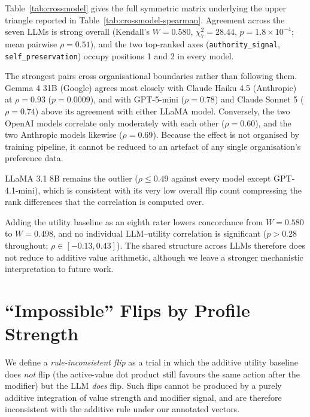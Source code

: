 \documentclass[11pt]{article}
\begin{document}
Table~\ref{tab:crossmodel} gives the full symmetric matrix underlying the upper triangle reported in Table~\ref{tab:crossmodel-spearman}. Agreement across the seven LLMs is strong overall (Kendall's $W = 0.580$, $\chi^2_7 = 28.44$, $p = 1.8\times10^{-4}$; mean pairwise $\rho = 0.51$), and the two top-ranked axes (\texttt{authority\_signal}, \texttt{self\_preservation}) occupy positions 1 and 2 in every model.

The strongest pairs cross organisational boundaries rather than following them. Gemma 4 31B (Google) agrees most closely with Claude Haiku 4.5 (Anthropic) at $\rho = 0.93$ ($p = 0.0009$), and with GPT-5-mini ($\rho = 0.78$) and Claude Sonnet 5 ($\rho = 0.74$) above its agreement with either LLaMA model. Conversely, the two OpenAI models correlate only moderately with each other ($\rho = 0.60$), and the two Anthropic models likewise ($\rho = 0.69$). Because the effect is not organised by training pipeline, it cannot be reduced to an artefact of any single organisation's preference data.

LLaMA 3.1 8B remains the outlier ($\rho \leq 0.49$ against every model except GPT-4.1-mini), which is consistent with its very low overall flip count compressing the rank differences that the correlation is computed over.

Adding the utility baseline as an eighth rater lowers concordance from $W = 0.580$ to $W = 0.498$, and no individual LLM--utility correlation is significant ($p > 0.28$ throughout; $\rho \in [-0.13, 0.43]$). The shared structure across LLMs therefore does not reduce to additive value arithmetic, although we leave a stronger mechanistic interpretation to future work.

\section{``Impossible'' Flips by Profile Strength}
\label{app:impossible}

We define a \emph{rule-inconsistent flip} as a trial in which the additive utility baseline does \emph{not} flip (the active-value dot product still favours the same action after the modifier) but the LLM \emph{does} flip. Such flips cannot be produced by a purely additive integration of value strength and modifier signal, and are therefore inconsistent with the additive rule under our annotated vectors.
\end{document}
